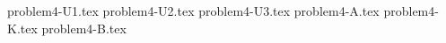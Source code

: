 \documentclass{article}
\begin{document}
{problem4-U1.tex}
{problem4-U2.tex}
{problem4-U3.tex}
{problem4-A.tex}
{problem4-K.tex}
{problem4-B.tex}
\end{document}
